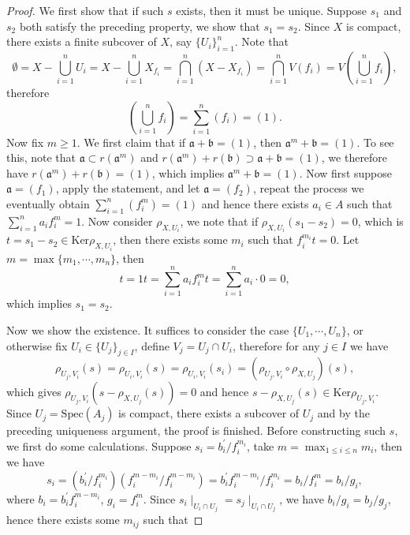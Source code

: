 \begin{proof}
We first show that if such $s$ exists, then it must be unique. Suppose $s_1$ and $s_2$ both satisfy the preceding property, we show that $s_1=s_2$. Since $X$ is compact, there exists a finite subcover of $X$, say $\{U_i\}_{i=1}^n$. Note that 
$$
\emptyset =X-\bigcup_{i=1}^n{U_i}=X-\bigcup_{i=1}^n{X_{f_i}}=\bigcap_{i=1}^n{\left( X-X_{f_i} \right)}=\bigcap_{i=1}^n{V\left( f_i \right)}=V\left( \bigcup_{i=1}^n{f_i} \right) ,
$$
therefore 
$$
\left( \bigcup_{i=1}^n{f_i} \right) =\sum_{i=1}^n{\left( f_i \right)}=\left( 1 \right) .
$$
Now fix $m\ge 1$. We first claim that if $\mathfrak{a}+\mathfrak{b}=(1)$, then $\mathfrak{a}^m+\mathfrak{b}=(1)$. To see this, note that $\mathfrak{a}\subset r(\mathfrak{a}^m)$ and $r(\mathfrak{a}^m)+r(\mathfrak{b})\supset\mathfrak{a}+\mathfrak{b}=(1)$, we therefore have $r(\mathfrak{a}^m)+r(\mathfrak{b})=(1)$, which implies $\mathfrak{a}^m+\mathfrak{b}=(1)$. Now first suppose $\mathfrak{a}=(f_1)$, apply the statement, and let $\mathfrak{a}=(f_2)$, repeat the process we eventually obtain $\sum_{i=1}^n{\left( f_{i}^{m} \right)}=\left( 1 \right) $ and hence there exists $a_i\in A$ such that $\sum_{i=1}^na_if_i^{m}=1$. Now consider $\rho_{X,U_i}$, we note that if $\rho_{X,U_i}(s_1-s_2)=0$, which is $t=s_1-s_2\in\mathrm{Ker}\rho_{X,U_i}$, then there exists some $m_i$ such that $f_i^{m_i}t=0$. Let $m=\max\{m_1,\cdots,m_n\}$, then 
$$
t=1t=\sum_{i=1}^n{a_if_{i}^{m}t}=\sum_{i=1}^n{a_i\cdot 0}=0,
$$
which implies $s_1=s_2$.\par
Now we show the existence. It suffices to consider the case $\{U_1,\cdots,U_n\}$, or otherwise fix $U_i\in\{U_j\}_{j\in I}$, define $V_j=U_j\cap U_i$, therefore for any $j\in I$ we have 
$$
\rho _{U_j,V_i}\left( s \right) =\rho _{U_i,V_i}\left( s \right) =\rho _{U_i,V_i}\left( s_i \right) =\left( \rho _{U_j,V_i}\circ \rho _{X,U_j} \right) \left( s \right) ,
$$
which gives $\rho _{U_j,V_i}\left( s-\rho _{X,U_j}\left( s \right) \right) =0$ and hence $s-\rho _{X,U_j}\left( s \right) \in \mathrm{Ker}\rho _{U_j,V_i}$. Since $U_j=\mathrm{Spec}(A_j)$ is compact, there exists a subcover of $U_j$ and by the preceding uniqueness argument, the proof is finished. Before constructing such $s$, we first do some calculations. Suppose $s_i=b_i^\prime/f_i^{m_i}$, take $m=\max_{1\le i\le n}m_i$, then we have 
$$
s_i=\left( b_{i}^{\prime}/f_{i}^{m_i} \right) \left( f_{i}^{m-m_i}/f_{i}^{m-m_i} \right) =b_{i}^{\prime}f_{i}^{m-m_i}/f_{i}^{m_i}=b_i/f_{i}^{m}=b_i/g_i,
$$
where $b_i=b_i^\prime f_i^{m-m_i}$, $g_i=f_i^m$. Since $s_i\mid_{U_i\cap U_j}=s_j\mid_{U_i\cap U_j}$, we have $b_i/g_i=b_j/g_j$, hence there exists some $m_{ij}$ such that 

\end{proof}
